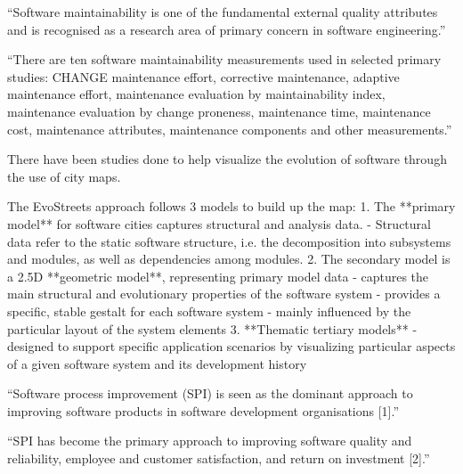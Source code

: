 \documentclass[12pt,letterpaper]{report}
\begin{document}
``Software maintainability is one of the fundamental external quality attributes and is recognised as a research area of primary concern in software engineering.'' \cite{alsolai:2019}

``There are ten software maintainability measurements used in selected primary studies: CHANGE maintenance effort, corrective maintenance, adaptive maintenance effort, maintenance evaluation by maintainability index, maintenance evaluation by change proneness, maintenance time, maintenance cost, maintenance attributes, maintenance components and other measurements.'' \cite{alsolai:2019}

There have been studies done to help visualize the evolution of software through the use of city maps. \cite{steinbruckner:2012}

The EvoStreets approach follows 3 models to build up the map:
1. The **primary model** for software cities captures structural and analysis data.
    - Structural data refer to the static software structure, i.e. the decomposition into subsystems and modules, as well as dependencies among modules.
2. The secondary model is a 2.5D **geometric model**, representing primary model data
    - captures the main structural and evolutionary properties of the software system
    - provides a specific, stable gestalt for each software system
      - mainly influenced by the particular layout of the system elements
3. **Thematic tertiary models**
    - designed to support specific application scenarios by visualizing particular aspects of a given software system and its development history
\cite{steinbruckner:2012}

``Software process improvement (SPI) is seen as the dominant approach to improving software products in software development organisations [1].'' \cite{herranz:2019}


``SPI has become the primary approach to improving software quality and reliability, employee and customer satisfaction, and return on investment [2].'' \cite{herranz:2019}


\end{document}
